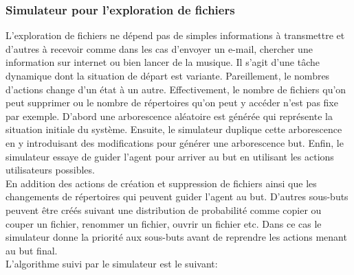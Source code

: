 \subsubsection*{Simulateur pour l'exploration de fichiers}
L'exploration de fichiers ne dépend pas de simples informations à transmettre et d'autres à recevoir comme dans les cas d'envoyer un e-mail, chercher une information sur internet ou bien lancer de la musique. Il s'agit d'une tâche dynamique dont la situation de départ est variante. Pareillement, le nombres d'actions change d'un état à un autre. Effectivement, le nombre de fichiers qu'on peut supprimer ou le nombre de répertoires qu'on peut y accéder n'est pas fixe par exemple.
D'abord une arborescence aléatoire est générée qui représente la situation initiale du système. Ensuite, le simulateur duplique cette arborescence en y introduisant des modifications pour générer une arborescence but. Enfin, le simulateur essaye de guider l'agent pour arriver au but en utilisant les actions utilisateurs possibles.\\
En addition des actions de création et suppression de fichiers ainsi que les changements de répertoires qui peuvent guider l'agent au but. D'autres sous-buts peuvent être créés suivant une distribution de probabilité comme copier ou couper un fichier, renommer un fichier, ouvrir un fichier etc. Dans ce cas le simulateur donne la priorité aux sous-buts avant de reprendre les actions menant au but final.\\
L'algorithme suivi par le simulateur est le suivant:
\makeatletter
\def\BState{\State\hskip-\ALG@thistlm}
\makeatother

